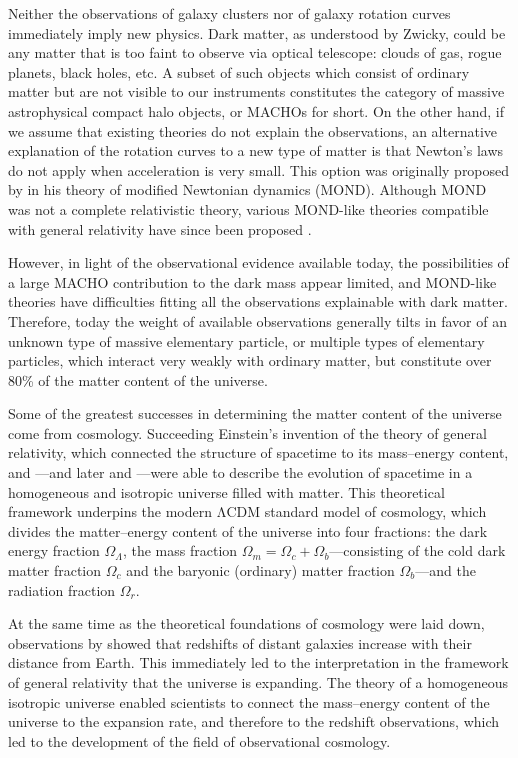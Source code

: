 \documentclass[b5paper, 10pt, twoside]{book}
\begin{document}
Neither the observations of galaxy clusters nor of galaxy rotation curves immediately imply new physics. Dark matter, as understood by Zwicky, could be any matter that is too faint to observe via optical telescope: clouds of gas, rogue planets, black holes, etc. A subset of such objects which consist of ordinary matter but are not visible to our instruments constitutes the category of massive astrophysical compact halo objects, or MACHOs for short. On the other hand, if we assume that existing theories do not explain the observations, an alternative explanation of the rotation curves to a new type of matter is that Newton's laws do not apply when acceleration is very small. This option was originally proposed by \textcite{Milgrom1983} in his theory of modified Newtonian dynamics (MOND). Although MOND was not a complete relativistic theory, various MOND-like theories compatible with general relativity have since been proposed \parencites{Bekenstein2004, Milgrom2009, SkordisZlosnik2021}.

However, in light of the observational evidence available today, the possibilities of a large MACHO contribution to the dark mass appear limited, and MOND-like theories have difficulties fitting all the observations explainable with dark matter. Therefore, today the weight of available observations generally tilts in favor of an unknown type of massive elementary particle, or multiple types of elementary particles, which interact very weakly with ordinary matter, but constitute over 80\% of the matter content of the universe.

Some of the greatest successes in determining the matter content of the universe come from cosmology. Succeeding Einstein's invention of the theory of general relativity, which connected the structure of spacetime to its mass--energy content, \textcites{Friedmann1922, Friedmann1924} and \textcite{Lemaitre1927}---and later \textcites{Robertson1935, Robertson1936a, Robertson1936b} and \textcite{Walker1937}---were able to describe the evolution of spacetime in a homogeneous and isotropic universe filled with matter. This theoretical framework underpins the modern ΛCDM standard model of cosmology, which divides the matter--energy content of the universe into four fractions: the dark energy fraction $\Omega_\Lambda$, the mass fraction $\Omega_m=\Omega_c+\Omega_b$---consisting of the cold dark matter fraction $\Omega_c$ and the baryonic (ordinary) matter fraction $\Omega_b$---and the radiation fraction $\Omega_r$.

At the same time as the theoretical foundations of cosmology were laid down, observations by \textcites{Slipher1917, Wirtz1922, Wirtz1924, Hubble1929} showed that redshifts of distant galaxies increase with their distance from Earth. This immediately led to the interpretation in the framework of general relativity that the universe is expanding. The theory of a homogeneous isotropic universe enabled scientists to connect the mass--energy content of the universe to the expansion rate, and therefore to the redshift observations, which led to the development of the field of observational cosmology.
\end{document}

